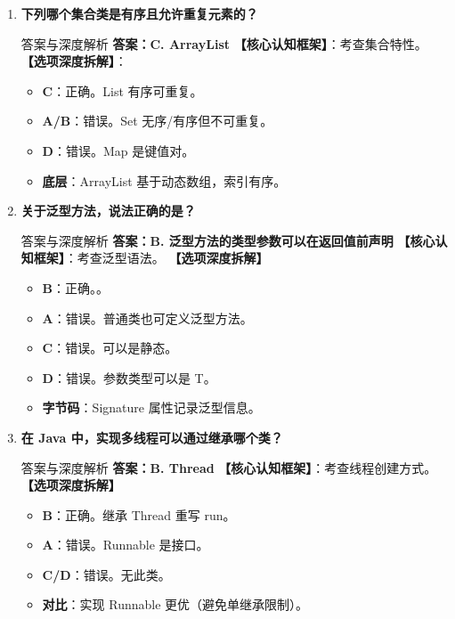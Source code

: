 ﻿\documentclass[12pt, a4paper]{ctexart}
\newcommand{\code}[1]{\texttt{\color{myblue}\detokenize{#1}}}
\begin{document}
\begin{enumerate}[label=\arabic*.]
	\item \textbf{下列哪个集合类是有序且允许重复元素的？}
	      \begin{bluebox}{答案与深度解析}
		      \textbf{答案：C. ArrayList}
		      \textbf{【核心认知框架】}：考查集合特性。
		      \textbf{【选项深度拆解】}：
		      \begin{itemize}[leftmargin=*, nosep]
			      \item \textbf{C}：正确。List 有序可重复。
			      \item \textbf{A/B}：错误。Set 无序/有序但不可重复。
			      \item \textbf{D}：错误。Map 是键值对。
			      \item \textbf{底层}：ArrayList 基于动态数组，索引有序。
		      \end{itemize}
	      \end{bluebox}

	\item \textbf{关于泛型方法，说法正确的是？}
	      \begin{bluebox}{答案与深度解析}
		      \textbf{答案：B. 泛型方法的类型参数可以在返回值前声明}
		      \textbf{【核心认知框架】}：考查泛型语法。
		      \textbf{【选项深度拆解】}
		      \begin{itemize}[leftmargin=*, nosep]
			      \item \textbf{B}：正确。\code{<T> T method()}。
			      \item \textbf{A}：错误。普通类也可定义泛型方法。
			      \item \textbf{C}：错误。可以是静态。
			      \item \textbf{D}：错误。参数类型可以是 T。
			      \item \textbf{字节码}：Signature 属性记录泛型信息。
		      \end{itemize}
	      \end{bluebox}

	\item \textbf{在 Java 中，实现多线程可以通过继承哪个类？}
	      \begin{bluebox}{答案与深度解析}
		      \textbf{答案：B. Thread}
		      \textbf{【核心认知框架】}：考查线程创建方式。
		      \textbf{【选项深度拆解】}
		      \begin{itemize}[leftmargin=*, nosep]
			      \item \textbf{B}：正确。继承 Thread 重写 run。
			      \item \textbf{A}：错误。Runnable 是接口。
			      \item \textbf{C/D}：错误。无此类。
			      \item \textbf{对比}：实现 Runnable 更优（避免单继承限制）。
		      \end{itemize}
	      \end{bluebox}


\end{enumerate}
\end{document}
